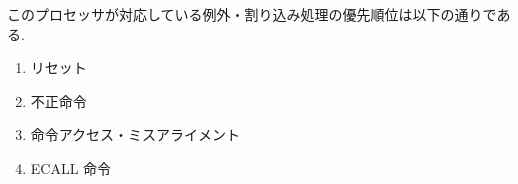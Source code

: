\documentclass[../specifications.tex]{subfiles}
\begin{document}
  このプロセッサが対応している例外・割り込み処理の優先順位は以下の通りである.
  \begin{enumerate}
    \item リセット
    \item 不正命令
    \item 命令アクセス・ミスアライメント
    \item ECALL 命令
  \end{enumerate}
\end{document}
